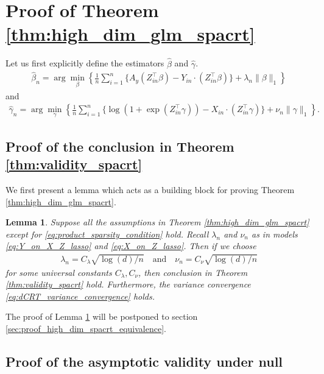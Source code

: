 \documentclass[12pt]{article}
\newtheorem{lemma}{Lemma}
\theoremstyle{definition}
\newcommand{\srz}{Z}									%
\begin{document}
\section{Proof of Theorem \ref{thm:high_dim_glm_spacrt}}\label{sec:proof_of_hd_glm_spacrt}

Let us first explicitly define the estimators $\widehat{\beta}$ and $\widehat{\gamma}$.
\begin{align}\label{eq:Y_on_X_Z_lasso}
  \widehat{\beta}_n=\arg\min_{\beta}\left\{\frac{1}{n}\sum_{i=1}^n \{A_y(\srz_{in}^\top\beta)-Y_{in}\cdot (\srz_{in}^\top\beta)\}+\lambda_n\|\beta\|_1\right\}
\end{align}
and 
\begin{align}\label{eq:X_on_Z_lasso}
  \widehat{\gamma}_n=\arg\min_{\gamma}\left\{\frac{1}{n}\sum_{i=1}^n \{\log(1 + \exp(\srz_{in}^\top\gamma))-X_{in}\cdot (\srz_{in}^\top\gamma)\}+\nu_n\|\gamma\|_1\right\}.
\end{align}


\subsection{Proof of the conclusion in Theorem \ref{thm:validity_spacrt}}

We first present a lemma which acts as a building block for proving Theorem \ref{thm:high_dim_glm_spacrt}.


\begin{lemma}\label{lem:high_dim_glm_spacrt}
  Suppose all the assumptions in Theorem \ref{thm:high_dim_glm_spacrt} except for \eqref{eq:product_sparsity_condition} hold. Recall $\lambda_n$ and $\nu_n$ as in models \eqref{eq:Y_on_X_Z_lasso} and \eqref{eq:X_on_Z_lasso}. Then if we choose 
  \begin{align*}
    \lambda_n=C_{\lambda} \sqrt{\log(d)/n}\quad\text{and}\quad\nu_n=C_{\nu}\sqrt{\log(d)/n}
  \end{align*}
  for some universal constants $C_\lambda,C_\nu$, then conclusion in Theorem \ref{thm:validity_spacrt} hold. Furthermore, the variance convergence \eqref{eq:dCRT_variance_convergence} holds. 
\end{lemma}
\noindent The proof of Lemma \ref{lem:high_dim_glm_spacrt} will be postponed to section \ref{sec:proof_high_dim_spacrt_equivalence}. 

\subsection{Proof of the asymptotic validity under null}
\end{document}
